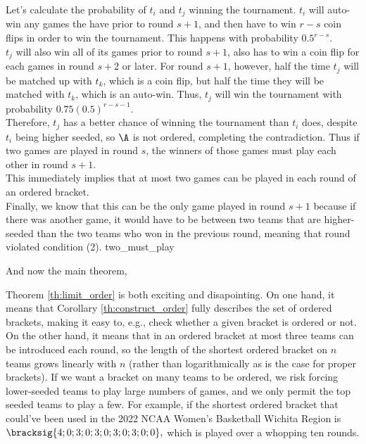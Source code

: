 {{    Let's calculate the probability of $t_i$ and $t_j$ winning the tournament. $t_i$ will auto-win any games the have prior to round $s+1$, and then have to win $r - s$ coin flips in order to win the tournament. This happens with probability $0.5^{r-s}.$\\

    $t_j$ will also win all of its games prior to round $s+1$, also has to win a coin flip for each games in round $s+2$ or later. For round $s+1$, however, half the time $t_j$ will be matched up with $t_k$, which is a coin flip, but half the time they will be matched with $t_k$, which is an auto-win. Thus, $t_j$ will win the tournament with probability $0.75(0.5)^{r-s-1}.$\\

    Therefore, $t_j$ has a better chance of winning the tournament than $t_i$ does, despite $t_i$ being higher seeded, so $\A$ is not ordered, completing the contradiction. Thus if two games are played in round $s$, the winners of those games must play each other in round $s+1.$\\

    This immediately implies that at most two games can be played in each round of an ordered bracket.\\
    
    Finally, we know that this can be the only game played in round $s+1$ because if there was another game, it would have to be between two teams that are higher-seeded than the two teams who won in the previous round, meaning that round violated condition (2).
}{two_must_play}

And now the main theorem,


Theorem \ref{th:limit_order} is both exciting and disapointing. On one hand, it means that Corollary \ref{th:construct_order} fully describes the set of ordered brackets, making it easy to, e.g., check whether a given bracket is ordered or not. On the other hand, it means that in an ordered bracket at most three teams can be introduced each round, so the length of the shortest ordered bracket on $n$ teams grows linearly with $n$ (rather than logarithmically as is the case for proper brackets). If we want a bracket on many teams to be ordered, we risk forcing lower-seeded teams to play large numbers of games, and we only permit the top seeded teams to play a few. For example, if the shortest ordered bracket that could've been used in the 2022 NCAA Women's Basketball Wichita Region is $\bracksig{4; 0; 3; 0; 3; 0; 3; 0; 3; 0; 0},$ which is played over a whopping ten rounds.

}
